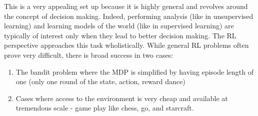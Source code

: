 \documentclass{article}
\begin{document}
This is a very appealing set up because it is highly general and revolves around the concept of decision making. Indeed, performing analysis (like in unsupervised learning) and learning models of the world (like in supervised learning) are typically of interest only when they lead to better decision making. The RL perspective approaches this task wholistically. While general RL problems often prove very difficult, there is broad success in two cases:

\begin{enumerate}
    \item The bandit problem where the MDP is simplified by having episode length of one (only one round of the state, action, reward dance)
    \item Cases where access to the environment is very cheap and available at tremendous scale - game play like chess, go, and starcraft.
\end{enumerate}
\end{document}
